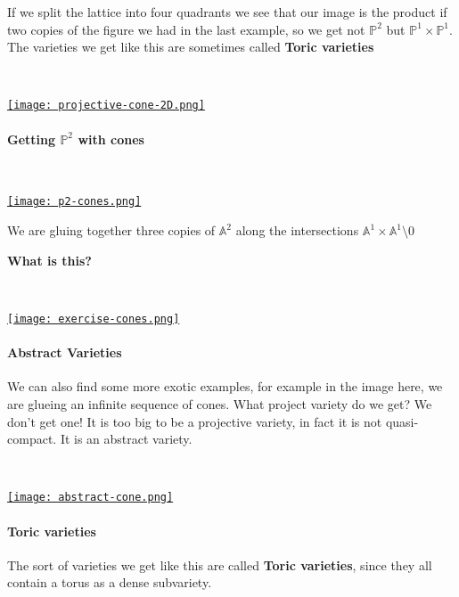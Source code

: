 \begin{example}
    If we split the lattice into four quadrants we see that our image is the product if two copies of the figure we had in the last example, so we get not $\mathbb{P}^2$ but $\mathbb{P}^1\times \mathbb{P}^1$. The varieties we get like this are sometimes called \textbf{Toric varieties}

    \

    \href{https://youtu.be/Sjp-99Xyiic?t=947}{\texttt{[image: projective-cone-2D.png]}}

    \paragraph*{Getting $\mathbb{P}^2$ with cones}

    \

    \href{https://youtu.be/Sjp-99Xyiic?t=1103}{\texttt{[image: p2-cones.png]}}

    We are gluing together three copies of $\mathbb{A}^2$ along the intersections $\mathbb{A}^1\times \mathbb{A}^1\setminus 0$

\newpage

    \begin{exercise}\textbf{ What is this?}

    \ 

        \href{https://youtu.be/Sjp-99Xyiic?t=1139}{\texttt{[image: exercise-cones.png]}}

    \end{exercise}

\end{example}

\paragraph*{Abstract Varieties}

We can also find some more exotic examples, for example in the image here, we are glueing an infinite sequence of cones. What project variety do we get? We don't get one! It is too big to be a projective variety, in fact it is not quasi-compact. It is an abstract variety.

\

\href{https://youtu.be/Sjp-99Xyiic?t=1306}{\texttt{[image: abstract-cone.png]}}


\paragraph*{Toric varieties}
The sort of varieties we get like this are called \textbf{Toric varieties}, since they all contain a torus as a dense subvariety.

